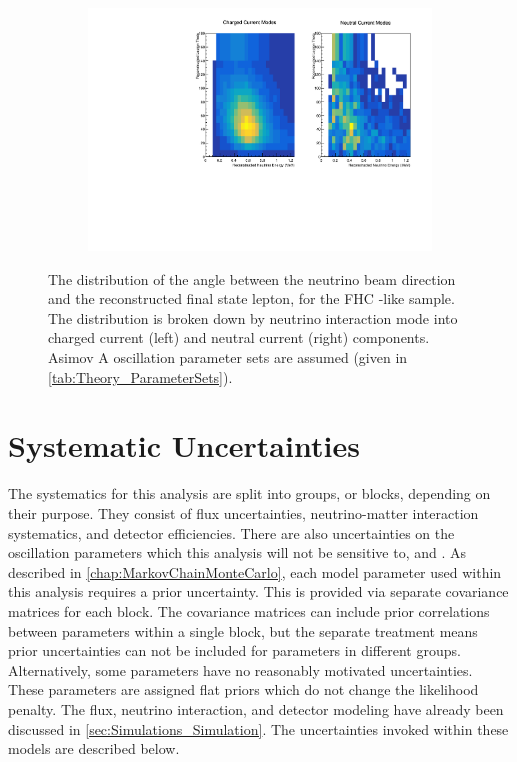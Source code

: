 \begin{figure}[h]
  \begin{subfigure}[t]{\textwidth}
    \includegraphics[width=\textwidth, trim={0mm 0mm 0mm 0mm}, clip,page=1]{Figures/Selections/2DSpectra_FHC1Re-2020.pdf}
  \end{subfigure}
  \caption{The distribution of the angle between the neutrino beam direction and the reconstructed final state lepton, for the FHC -like sample. The distribution is broken down by neutrino interaction mode into charged current (left) and neutral current (right) components. Asimov A oscillation parameter sets are assumed (given in \autoref{tab:Theory_ParameterSets}). }
  \label{fig:SelsAndSysts_Beam_FHC1ReThetaSpectra}
\end{figure}

\clearpage
\section{Systematic Uncertainties}
\label{sec:SelsAndSysts_Systs}

The systematics for this analysis are split into groups, or blocks, depending on their purpose. They consist of flux uncertainties, neutrino-matter interaction systematics, and detector efficiencies. There are also uncertainties on the oscillation parameters which this analysis will not be sensitive to, \delmsqsol and \sinsqsol. As described in \autoref{chap:MarkovChainMonteCarlo}, each model parameter used within this analysis requires a prior uncertainty. This is provided via separate covariance matrices for each block. The covariance matrices can include prior correlations between parameters within a single block, but the separate treatment means prior uncertainties can not be included for parameters in different groups. Alternatively, some parameters have no reasonably motivated uncertainties. These parameters are assigned flat priors which do not change the likelihood penalty. The flux, neutrino interaction, and detector modeling have already been discussed in \autoref{sec:Simulations_Simulation}. The uncertainties invoked within these models are described below.

